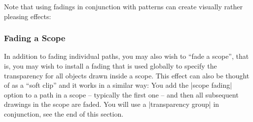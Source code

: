 Note that using fadings in conjunction with patterns can create visually rather
pleasing effects:
%
\begin{codeexample}[preamble={\usetikzlibrary{fadings,patterns,shadows}}]
\tikzfading[name=middle,
            top color=transparent!50,
            bottom color=transparent!50,
            middle color=transparent!20]
\end{codeexample}


\subsubsection{Fading a Scope}

In addition to fading individual paths, you may also wish to ``fade a scope'',
that is, you may wish to install a fading that is used globally to specify the
transparency for all objects drawn inside a scope. This effect can also be
thought of as a ``soft clip'' and it works in a similar way: You add the
|scope fading| option to a path in a scope -- typically the first one -- and
then all subsequent drawings in the scope are faded. You will use a
|transparency group| in conjunction, see the end of this section.

